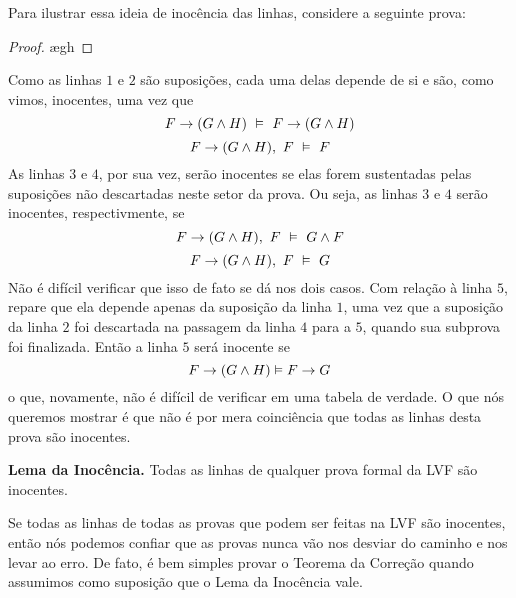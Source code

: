 Para ilustrar essa ideia de inocência das linhas, considere a seguinte prova:
	\begin{proof}
		\open
			\ae{gh}
		\close
	\end{proof}\noindent\noindent
Como as linhas $1$ e $2$ são suposições, cada uma delas depende de si e são, como vimos, inocentes, uma vez que
	$$F \eif (G \eand H) \ \entails \ F \eif (G \eand H)$$
	$$F \rightarrow (G \wedge H), \ F \ \vDash \ F$$ 
As linhas $3$ e $4$, por sua vez, serão inocentes se elas forem sustentadas pelas suposições não descartadas neste setor da prova.
Ou seja, as linhas $3$ e $4$ serão inocentes, respectivmente, se
	$$F \rightarrow (G \wedge H), \ F \ \vDash \ G \wedge F$$
	$$F \rightarrow (G \wedge H), \ F \ \vDash \ G$$
Não é difícil verificar que isso de fato se dá nos dois casos.
Com relação à linha $5$, repare que ela depende apenas da suposição da linha $1$, uma vez que a suposição da linha $2$ foi descartada na passagem da linha $4$ para a $5$, quando sua subprova foi finalizada.
Então a linha $5$ será inocente se
	$$F \rightarrow (G \wedge H) \vDash F \rightarrow G$$
o que, novamente, não é difícil de verificar em uma tabela de verdade.
O que nós queremos mostrar é que não é por mera coinciência que todas as linhas desta prova são inocentes.
	\begin{factoidboxe}\textbf{Lema da Inocência.}
		Todas as linhas de qualquer prova formal da LVF são inocentes.
	\end{factoidboxe}\noindent
Se todas as linhas de todas as provas que podem ser feitas na LVF são inocentes, então nós podemos confiar que as provas nunca vão nos desviar do caminho e nos levar ao erro.
De fato, é bem simples provar o Teorema da Correção quando assumimos como suposição que o Lema da Inocência vale.

